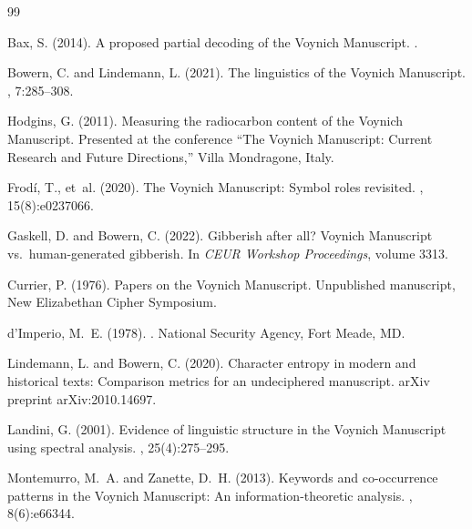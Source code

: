 \documentclass[12pt]{article}
\begin{document}
\begin{thebibliography}{99}

Bax, S. (2014).
\newblock A proposed partial decoding of the Voynich Manuscript.
.

Bowern, C. and Lindemann, L. (2021).
\newblock The linguistics of the Voynich Manuscript.
, 7:285--308.

Hodgins, G. (2011).
\newblock Measuring the radiocarbon content of the Voynich Manuscript.
\newblock Presented at the conference ``The Voynich Manuscript: Current Research and Future Directions,'' Villa Mondragone, Italy.

Frod\'{i}, T., et~al. (2020).
\newblock The Voynich Manuscript: Symbol roles revisited.
, 15(8):e0237066.

Gaskell, D. and Bowern, C. (2022).
\newblock Gibberish after all? Voynich Manuscript vs.\ human-generated gibberish.
\newblock In {\em CEUR Workshop Proceedings}, volume 3313.

Currier, P. (1976).
\newblock Papers on the Voynich Manuscript.
\newblock Unpublished manuscript, New Elizabethan Cipher Symposium.

d'Imperio, M.~E. (1978).
.
\newblock National Security Agency, Fort Meade, MD.

Lindemann, L. and Bowern, C. (2020).
\newblock Character entropy in modern and historical texts: Comparison metrics for an undeciphered manuscript.
\newblock arXiv preprint arXiv:2010.14697.

Landini, G. (2001).
\newblock Evidence of linguistic structure in the Voynich Manuscript using spectral analysis.
, 25(4):275--295.

Montemurro, M.~A. and Zanette, D.~H. (2013).
\newblock Keywords and co-occurrence patterns in the Voynich Manuscript: An information-theoretic analysis.
, 8(6):e66344.


\end{thebibliography}
\end{document}
